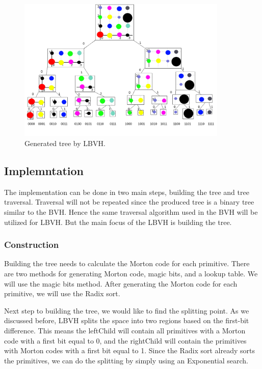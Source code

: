 \documentclass[11pt,a4paper]{article}
\begin{document}
\begin{figure}[h]	
     \centering
     \captionsetup{justification=centering,margin=2cm}
     \includegraphics[width=10cm]{images/example_lbvh/tree.png}
     \caption{Generated tree by LBVH.}
     \label{fig:dice}
\end{figure}


\subsection{Implemntation}
The implementation can be done in two main steps, building the tree and tree traversal. Traversal will not be repeated since the produced tree is a binary tree similar to the BVH. Hence the same traversal algorithm used in the BVH will be utilized for LBVH. But the main focus of the LBVH is building the tree.


\subsubsection{Construction}
 Building the tree needs to calculate the Morton code for each primitive. There are two methods for generating Morton code, magic bits, and a lookup table. We will use the magic bits method. After generating the Morton code for each primitive, we will use the Radix sort.
\\
\noindent

Next step to building the tree, we would like to find the splitting point. As we discussed before, LBVH splits the space into two regions based on the first-bit difference. This means the leftChild will contain all primitives with a Morton code with a first bit equal to 0, and the rightChild will contain the primitives with Morton codes with a first bit equal to 1. Since the Radix sort already sorts the primitives, we can do the splitting by simply using an Exponential search. 
\\
\noindent
\end{document}
